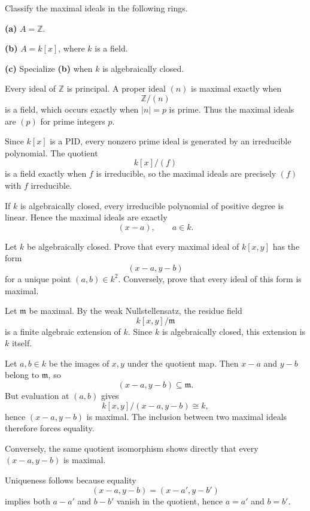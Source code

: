 \begin{problem}[CP-V-0006]
\label{prob:cp-v-0006}
Classify the maximal ideals in the following rings.

\textbf{(a)} \(A=\mathbb Z\).

\textbf{(b)} \(A=k[x]\), where \(k\) is a field.

\textbf{(c)} Specialize \textbf{(b)} when \(k\) is algebraically closed.
\end{problem}

\begin{solution}
Every ideal of \(\mathbb Z\) is principal. A proper ideal \((n)\) is maximal
exactly when
\[
\mathbb Z/(n)
\]
is a field, which occurs exactly when \(|n|=p\) is prime. Thus the maximal
ideals are \((p)\) for prime integers \(p\).

Since \(k[x]\) is a PID, every nonzero prime ideal is generated by an
irreducible polynomial. The quotient
\[
k[x]/(f)
\]
is a field exactly when \(f\) is irreducible, so the maximal ideals are
precisely \((f)\) with \(f\) irreducible.

If \(k\) is algebraically closed, every irreducible polynomial of positive
degree is linear. Hence the maximal ideals are exactly
\[
(x-a),\qquad a\in k.
\]
\end{solution}


\begin{problem}[CP-V-0007]
\label{prob:cp-v-0007}
Let \(k\) be algebraically closed. Prove that every maximal ideal of
\(k[x,y]\) has the form
\[
(x-a,y-b)
\]
for a unique point \((a,b)\in k^2\). Conversely, prove that every ideal of
this form is maximal.
\end{problem}

\begin{solution}
Let \(\mathfrak m\) be maximal. By the weak Nullstellensatz, the residue
field
\[
k[x,y]/\mathfrak m
\]
is a finite algebraic extension of \(k\). Since \(k\) is algebraically
closed, this extension is \(k\) itself.

Let \(a,b\in k\) be the images of \(x,y\) under the quotient map. Then
\(x-a\) and \(y-b\) belong to \(\mathfrak m\), so
\[
(x-a,y-b)\subseteq\mathfrak m.
\]
But evaluation at \((a,b)\) gives
\[
k[x,y]/(x-a,y-b)\cong k,
\]
hence \((x-a,y-b)\) is maximal. The inclusion between two maximal ideals
therefore forces equality.

Conversely, the same quotient isomorphism shows directly that every
\((x-a,y-b)\) is maximal.

Uniqueness follows because equality
\[
(x-a,y-b)=(x-a',y-b')
\]
implies both \(a-a'\) and \(b-b'\) vanish in the quotient, hence
\(a=a'\) and \(b=b'\).
\end{solution}


